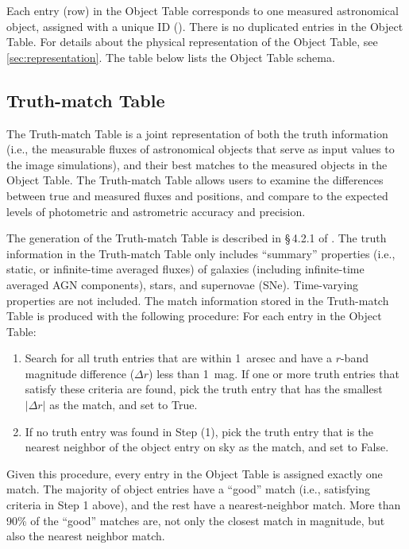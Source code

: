 \documentclass[11pt]{report}
\begin{document}
Each entry (row) in the Object Table corresponds to one measured astronomical object, assigned with a unique ID (). There is no duplicated entries in the Object Table. For details about the physical representation of the Object Table, see \autoref{sec:representation}. The table below lists the Object Table schema. 


\subsection{Truth-match Table}
\label{sec:truth}

The Truth-match Table is a joint representation of both the truth information (i.e., the measurable fluxes of astronomical objects that serve as input values to the image simulations), and their best matches to the measured objects in the Object Table. The Truth-match Table allows users to examine the differences between true and measured fluxes and positions, and compare to the expected levels of photometric and astrometric accuracy and precision.

The generation of the Truth-match Table is described in \S\,4.2.1 of \cite{2020arXiv201005926L}. The truth information in the Truth-match Table only includes ``summary'' properties (i.e., static, or infinite-time averaged fluxes) of galaxies (including infinite-time averaged AGN components), stars, and supernovae (SNe). Time-varying properties are not included. The match information stored in the  Truth-match Table is produced with the following procedure: For each entry in the Object Table:
\begin{enumerate}
    \item Search for all truth entries that are within 1~arcsec and have a $r$-band magnitude difference ($\Delta r$) less than 1~mag. If one or more truth entries that satisfy these criteria are found, pick the truth entry that has the smallest $|\Delta r|$ as the match, and set  to True.
    \item If no truth entry was found in Step (1), pick the truth entry that is the nearest neighbor of the object entry on sky as the match, and set  to False.
\end{enumerate}
Given this procedure, every entry in the Object Table is assigned exactly one match. The majority of object entries have a ``good'' match (i.e., satisfying criteria in Step 1 above), and the rest have a nearest-neighbor match. More than 90\% of the ``good'' matches are, not only the closest match in magnitude, but also the nearest neighbor match. 
\end{document}
